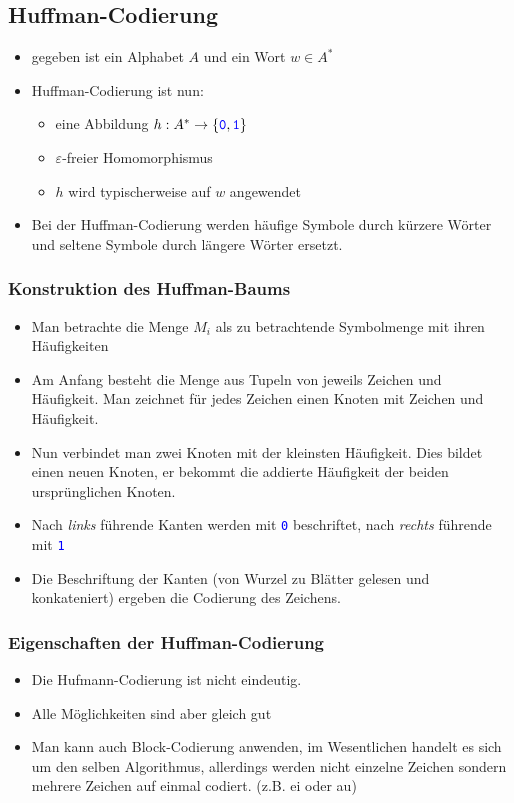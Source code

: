 \documentclass{article}
\newcommand{\blue}[1]{\textcolor{blue}{#1}}
\newcommand{\word}[1]{\blue{\texttt{#1}}}
\newcommand{\set}[1]{\{#1\}}
\newcommand{\anfuehrung}[1]{\flqq #1\frqq}
\begin{document}
\subsection{Huffman-Codierung}
\begin{itemize}
    \item gegeben ist ein Alphabet $A$ und ein Wort $w\in A^*$
    \item Huffman-Codierung ist nun:
    \begin{itemize}
        \item eine Abbildung $h:A^*\to\set{\word{0},\word{1}}$
        \item $\varepsilon$-freier Homomorphismus
        \item $h$ wird typischerweise auf $w$ angewendet
    \end{itemize}
    \item Bei der Huffman-Codierung werden häufige Symbole durch kürzere Wörter und seltene Symbole durch längere Wörter ersetzt.
\end{itemize}
\subsubsection{Konstruktion des Huffman-Baums}
\begin{itemize}
    \item Man betrachte die Menge $M_i$ als \anfuehrung{zu betrachtende Symbolmenge mit ihren Häufigkeiten}
    \item Am Anfang besteht die Menge aus Tupeln von jeweils Zeichen und Häufigkeit. Man zeichnet für jedes Zeichen einen Knoten mit Zeichen und Häufigkeit.
    \item Nun verbindet man zwei Knoten mit der kleinsten Häufigkeit. Dies bildet einen neuen Knoten, er bekommt die addierte Häufigkeit der beiden ursprünglichen Knoten.
    \item Nach \textit{links} führende Kanten werden mit \word{0} beschriftet, nach \textit{rechts} führende mit \word{1}
    \item Die Beschriftung der Kanten (von Wurzel zu Blätter gelesen und konkateniert) ergeben die Codierung des Zeichens.
\end{itemize}

\subsubsection{Eigenschaften der Huffman-Codierung}
\begin{itemize}
    \item Die Hufmann-Codierung ist nicht eindeutig.
    \item Alle Möglichkeiten sind aber \anfuehrung{gleich gut}
    \item Man kann auch \anfuehrung{Block-Codierung} anwenden, im Wesentlichen handelt es sich um den selben Algorithmus, allerdings werden nicht einzelne Zeichen sondern mehrere Zeichen auf einmal codiert. (z.B. \anfuehrung{ei} oder \anfuehrung{au})
\end{itemize}
\end{document}
